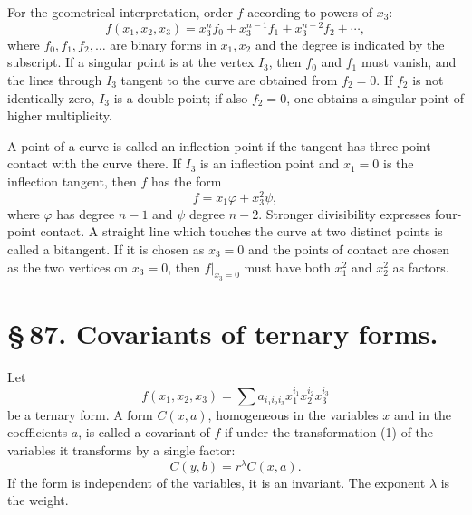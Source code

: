 \documentclass[11pt]{article}
\begin{document}
For the geometrical interpretation, order $f$ according to powers of $x_3$:
\begin{equation}
 f(x_1,x_2,x_3)=x_3^n f_0+x_3^{n-1}f_1+x_3^{n-2}f_2+\cdots,
 \tag{3}
\end{equation}
where $f_0,f_1,f_2,\ldots$ are binary forms in $x_1,x_2$ and the degree is indicated by the subscript. If a singular point is at the vertex $I_3$, then $f_0$ and $f_1$ must vanish, and the lines through $I_3$ tangent to the curve are obtained from $f_2=0$. If $f_2$ is not identically zero, $I_3$ is a double point; if also $f_2=0$, one obtains a singular point of higher multiplicity.

A point of a curve is called an inflection point if the tangent has three-point contact with the curve there. If $I_3$ is an inflection point and $x_1=0$ is the inflection tangent, then $f$ has the form
\begin{equation}
 f=x_1\varphi+x_3^2\psi,
 \tag{4}
\end{equation}
where $\varphi$ has degree $n-1$ and $\psi$ degree $n-2$. Stronger divisibility expresses four-point contact. A straight line which touches the curve at two distinct points is called a bitangent. If it is chosen as $x_3=0$ and the points of contact are chosen as the two vertices on $x_3=0$, then $f\vert_{x_3=0}$ must have both $x_1^2$ and $x_2^2$ as factors.

\section*{\S\,87. Covariants of ternary forms.}

Let
\[
 f(x_1,x_2,x_3)=\sum a_{i_1i_2i_3}x_1^{i_1}x_2^{i_2}x_3^{i_3}
\]
be a ternary form. A form $C(x,a)$, homogeneous in the variables $x$ and in the coefficients $a$, is called a covariant of $f$ if under the transformation (1) of the variables it transforms by a single factor:
\begin{equation}
 C(y,b)=r^\lambda C(x,a).
 \tag{1}
\end{equation}
If the form is independent of the variables, it is an invariant. The exponent $\lambda$ is the weight.
\end{document}
